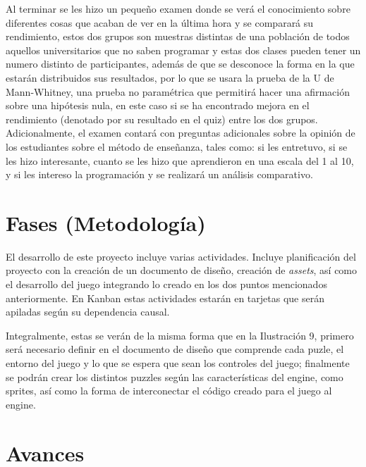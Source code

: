 Al terminar se les hizo un pequeño examen donde se verá el conocimiento sobre diferentes cosas que acaban de ver en la última hora y se comparará su rendimiento, estos dos grupos son muestras distintas de una población de todos aquellos universitarios que no saben programar y estas dos clases pueden tener un numero distinto de participantes, además de que se desconoce la forma en la que estarán distribuidos sus resultados, por lo que se usara la prueba de la U de Mann-Whitney, una prueba no paramétrica que permitirá hacer una afirmación sobre una hipótesis nula, en este caso si se ha encontrado mejora en el rendimiento (denotado por su resultado en el quiz) entre los dos grupos.
Adicionalmente, el examen contará con preguntas adicionales sobre la opinión de los estudiantes sobre el método de enseñanza, tales como: si les entretuvo, si se les hizo interesante, cuanto se les hizo que aprendieron en una escala del 1 al 10, y si les intereso la programación y se realizará un análisis comparativo. 

\section{Fases (Metodología)}
El desarrollo de este proyecto incluye varias actividades. Incluye planificación del proyecto con la creación de un documento de diseño, creación de \textit{assets}, así como el desarrollo del juego integrando lo creado en los dos puntos mencionados anteriormente.
En Kanban estas actividades estarán en tarjetas que serán apiladas según su dependencia causal. 

Integralmente, estas se verán de la misma forma que en la Ilustración 9, primero será necesario definir en el documento de diseño que comprende cada puzle, el entorno del juego y lo que se espera que sean los controles del juego; finalmente se podrán crear los distintos puzzles según las características del engine, como sprites, así como la forma de interconectar el código creado para el juego al engine.

\section{Avances}
